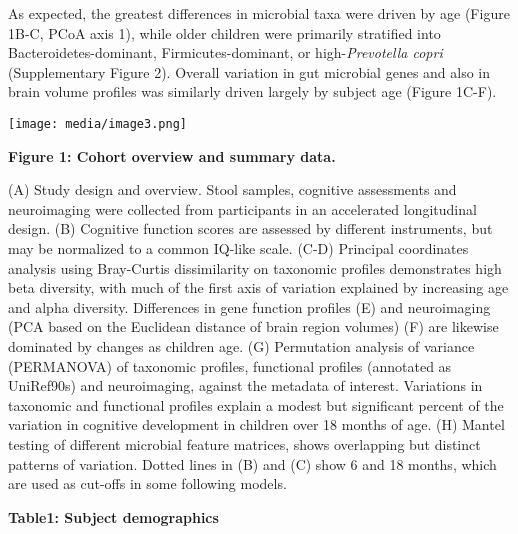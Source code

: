 \documentclass[
]{article}
\begin{document}
As expected, the greatest differences in microbial taxa were driven by
age (Figure 1B-C, PCoA axis 1), while older children were primarily
stratified into Bacteroidetes-dominant, Firmicutes-dominant, or
high-\emph{Prevotella copri} (Supplementary Figure 2). Overall variation
in gut microbial genes and also in brain volume profiles was similarly
driven largely by subject age (Figure 1C-F).

\texttt{[image: media/image3.png]}

\textbf{Figure 1: Cohort overview and summary data.}

(A) Study design and overview. Stool samples, cognitive assessments and
neuroimaging were collected from participants in an accelerated
longitudinal design. (B) Cognitive function scores are assessed by
different instruments, but may be normalized to a common IQ-like scale.
(C-D) Principal coordinates analysis using Bray-Curtis dissimilarity on
taxonomic profiles demonstrates high beta diversity, with much of the
first axis of variation explained by increasing age and alpha diversity.
Differences in gene function profiles (E) and neuroimaging (PCA based on
the Euclidean distance of brain region volumes) (F) are likewise
dominated by changes as children age. (G) Permutation analysis of
variance (PERMANOVA) of taxonomic profiles, functional profiles
(annotated as UniRef90s) and neuroimaging, against the metadata of
interest. Variations in taxonomic and functional profiles explain a
modest but significant percent of the variation in cognitive development
in children over 18 months of age. (H) Mantel testing of different
microbial feature matrices, shows overlapping but distinct patterns of
variation. Dotted lines in (B) and (C) show 6 and 18 months, which are
used as cut-offs in some following models.

\textbf{Table1: Subject demographics}
\end{document}
